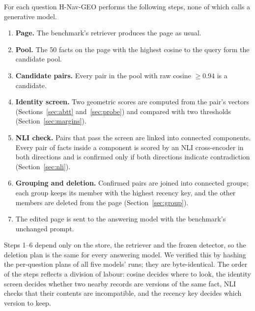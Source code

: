 \documentclass{CUP-JNL-NLP}
\newcommand{\geo}{H-Nav-GEO}
\begin{document}
For each question \geo{} performs the following steps, none of which calls a generative model.
\begin{enumerate}
\item \textbf{Page.} The benchmark's retriever produces the page as usual.
\item \textbf{Pool.} The 50 facts on the page with the highest cosine to the query form the candidate pool.
\item \textbf{Candidate pairs.} Every pair in the pool with raw cosine $\ge0.94$ is a candidate.
\item \textbf{Identity screen.} Two geometric scores are computed from the pair's vectors (Sections~\ref{sec:abtt} and~\ref{sec:probe}) and compared with two thresholds (Section~\ref{sec:margins}).
\item \textbf{NLI check.} Pairs that pass the screen are linked into connected components. Every pair of facts inside a component is scored by an NLI cross-encoder in both directions and is confirmed only if both directions indicate contradiction (Section~\ref{sec:nli}).
\item \textbf{Grouping and deletion.} Confirmed pairs are joined into connected groups; each group keeps its member with the highest recency key, and the other members are deleted from the page (Section~\ref{sec:group}).
\item The edited page is sent to the answering model with the benchmark's unchanged prompt.
\end{enumerate}

Steps 1--6 depend only on the store, the retriever and the frozen detector, so the deletion plan is the same for every answering model. We verified this by hashing the per-question plans of all five models' runs; they are byte-identical. The order of the steps reflects a division of labour: cosine decides where to look, the identity screen decides whether two nearby records are versions of the same fact, NLI checks that their contents are incompatible, and the recency key decides which version to keep.
\end{document}
